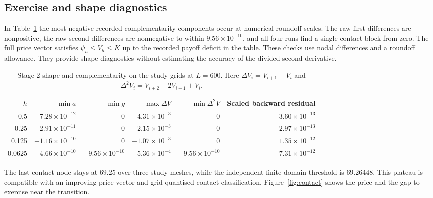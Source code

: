 \documentclass[11pt,a4paper]{article}
\numberwithin{equation}{section}
\begin{document}
\subsection{Exercise and shape diagnostics}
In Table~\ref{tab:shape} the most negative recorded complementarity
components occur at numerical roundoff scales. The raw first differences
are nonpositive, the raw second differences are nonnegative to within
$9.56\times10^{-10}$, and all four runs find a single contact block from
zero. The full price vector satisfies $\psi_h\le V_h\le K$ up to the
recorded payoff deficit in the table. These checks use nodal differences
and a roundoff allowance. They provide shape diagnostics without
estimating the accuracy of the divided second derivative.

\begin{table}[htbp]
\centering\small
\caption{Stage 2 shape and complementarity on the study grids at $L=600$.
Here $\Delta V_i=V_{i+1}-V_i$ and
$\Delta^2 V_i=V_{i+2}-2V_{i+1}+V_i$.}
\label{tab:shape}
\begin{tabular}{@{}rrrrrr@{}}
\toprule
$h$ & $\min a$ & $\min g$ & $\max\Delta V$ & $\min\Delta^2 V$ & Scaled backward residual\\
\midrule
0.5    & $-7.28\times10^{-12}$ & $0$ & $-4.31\times10^{-3}$ & $0$ & $3.60\times10^{-13}$\\
0.25   & $-2.91\times10^{-11}$ & $0$ & $-2.15\times10^{-3}$ & $0$ & $2.97\times10^{-13}$\\
0.125  & $-1.16\times10^{-10}$ & $0$ & $-1.07\times10^{-3}$ & $0$ & $1.35\times10^{-12}$\\
0.0625 & $-4.66\times10^{-10}$ & $-9.56\times10^{-10}$ & $-5.36\times10^{-4}$ & $-9.56\times10^{-10}$ & $7.31\times10^{-12}$\\
\bottomrule
\end{tabular}
\end{table}

The last contact node stays at $69.25$ over three study meshes, while
the independent finite-domain threshold is $69.26448$. This plateau
is compatible with an improving price vector and grid-quantised
contact classification. Figure~\ref{fig:contact} shows the price
and the gap to exercise near the transition.
\end{document}

